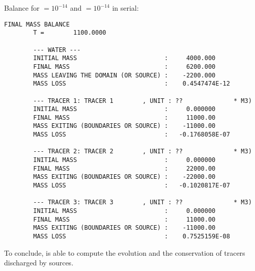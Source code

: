 \bigskip
Balance for  $= 10^{-14}$ and
 $= 10^{-14}$ in serial:
%
\begin{lstlisting}[language=TelFortran]
                        FINAL MASS BALANCE
        T =        1100.0000

        --- WATER ---
        INITIAL MASS                        :     4000.000
        FINAL MASS                          :     6200.000
        MASS LEAVING THE DOMAIN (OR SOURCE) :    -2200.000
        MASS LOSS                           :    0.4547474E-12

        --- TRACER 1: TRACER 1        , UNIT : ??              * M3)
        INITIAL MASS                        :     0.000000
        FINAL MASS                          :     11000.00
        MASS EXITING (BOUNDARIES OR SOURCE) :    -11000.00
        MASS LOSS                           :   -0.1768058E-07

        --- TRACER 2: TRACER 2        , UNIT : ??              * M3)
        INITIAL MASS                        :     0.000000
        FINAL MASS                          :     22000.00
        MASS EXITING (BOUNDARIES OR SOURCE) :    -22000.00
        MASS LOSS                           :   -0.1020817E-07

        --- TRACER 3: TRACER 3        , UNIT : ??              * M3)
        INITIAL MASS                        :     0.000000
        FINAL MASS                          :     11000.00
        MASS EXITING (BOUNDARIES OR SOURCE) :    -11000.00
        MASS LOSS                           :    0.7525159E-08
\end{lstlisting}
%
\bigskip
To conclude,  is able to compute the evolution and the conservation of
tracers discharged by sources.
%
